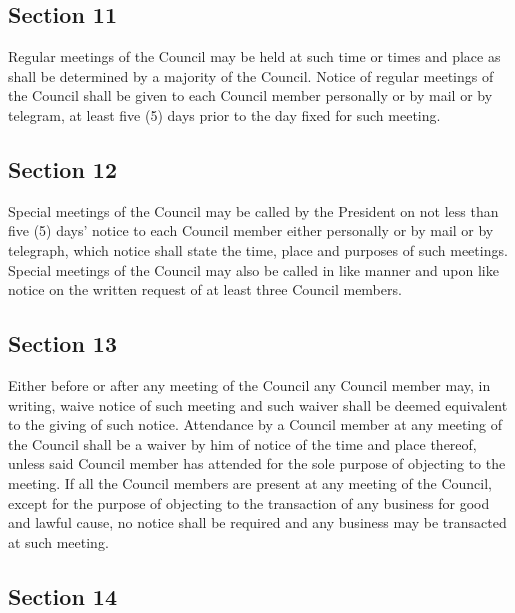 \documentclass[
  14pt,
]{book}
\begin{document}
\hypertarget{section-11-1}{%
\subsection*{Section 11}\label{section-11-1}}

Regular meetings of the Council may be held at such time or times and place as shall be determined by a majority of the Council. Notice of regular meetings of the Council shall be given to each Council member personally or by mail or by telegram, at least five (5) days prior to the day fixed for such meeting.

\hypertarget{section-12}{%
\subsection*{Section 12}\label{section-12}}

Special meetings of the Council may be called by the President on not less than five (5) days' notice to each Council member either personally or by mail or by telegraph, which notice shall state the time, place and purposes of such meetings. Special meetings of the Council may also be called in like manner and upon like notice on the written request of at least three Council members.

\hypertarget{section-13}{%
\subsection*{Section 13}\label{section-13}}

Either before or after any meeting of the Council any Council member may, in writing, waive notice of such meeting and such waiver shall be deemed equivalent to the giving of such notice. Attendance by a Council member at any meeting of the Council shall be a waiver by him of notice of the time and place thereof, unless said Council member has attended for the sole purpose of objecting to the meeting. If all the Council members are present at any meeting of the Council, except for the purpose of objecting to the transaction of any business for good and lawful cause, no notice shall be required and any business may be transacted at such meeting.

\hypertarget{section-14}{%
\subsection*{Section 14}\label{section-14}}
\end{document}
